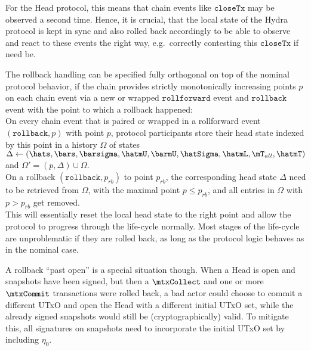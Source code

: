 For the Head protocol, this means that chain events like $\mathtt{closeTx}$ may
be observed a second time. Hence, it is crucial, that the local state of the
Hydra protocol is kept in sync and also rolled back accordingly to be able to
observe and react to these events the right way, e.g.\ correctly contesting this
$\mathtt{closeTx}$ if need be.

The rollback handling can be specified fully orthogonal on top of the nominal
protocol behavior, if the chain provides strictly monotonically increasing
points $p$ on each chain event via a new or wrapped $\mathtt{rollforward}$
event and $\mathtt{rollback}$ event with the point to which a rollback happened:\\

\quad On every chain event that is paired or
wrapped in a rollforward event $(\mathtt{rollback},p)$ with point $p$, protocol
participants store their head state indexed by this point in a history
$\Omega$ of states
$\Delta \gets (\hats, \bars, \barsigma, \hatmU, \barmU, \hatSigma, \hatmL, \mT_{all}, \hatmT)$ and $\Omega' = (p, \Delta) \cup \Omega$. \\

\quad On a rollback
$(\mathtt{rollback},p_{rb})$ to point $p_{rb}$, the corresponding head state
$\Delta$ need to be retrieved from $\Omega$, with the maximal point
$p \leq p_{rb}$, and all entries in $\Omega$ with $p > p_{rb}$ get removed. \\

This will essentially reset the local head state to the right point and allow
the protocol to progress through the life-cycle normally. Most stages of the
life-cycle are unproblematic if they are rolled back, as long as the protocol
logic behaves as in the nominal case.

A rollback ``past open'' is a special situation though. When a Head is open and
snapshots have been signed, but then a $\mtxCollect$ and one or more
$\mtxCommit$ transactions were rolled back, a bad actor could choose to commit a
different UTxO and open the Head with a different initial UTxO set, while the
already signed snapshots would still be (cryptographically) valid. To mitigate
this, all signatures on snapshots need to incorporate the initial UTxO set by
including $\eta_{0}$.





